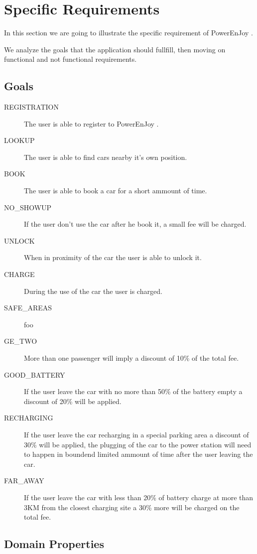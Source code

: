 \documentclass[11pt]{article} %
\newcommand{\pe}{PowerEnJoy }
\begin{document}
 




\newpage
\section{Specific Requirements}

In this section we are going to illustrate the specific requirement of \pe.

We analyze the goals that the application should fullfill, then moving on functional and not functional requirements.

 \subsection{Goals}
 
 \begin{description}
 	\item[REGISTRATION] The user is able to register to \pe.
 	\item[LOOKUP] The user is able to find cars nearby it's own position.
 	\item[BOOK] The user is able to book a car for a short ammount of time.
 	\item[NO\_SHOWUP] If the user don't use the car after he book it, a small fee will be charged.
 	\item[UNLOCK] When in proximity of the car the user is able to unlock it.
 	\item[CHARGE] During the use of the car the user is charged.
 	\item[SAFE\_AREAS] foo
 	\item[GE\_TWO] More than one passenger will imply a discount of 10\% of the total fee.
 	\item[GOOD\_BATTERY] If the user leave the car with no more than 50\% of the battery empty a discount of 20\% will be applied.
 	\item[RECHARGING] If the user leave the car recharging in a special parking area a discount of 30\% will be applied, the plugging of the car to the power station will need to happen in boundend limited ammount of time after the user leaving the car.
 	\item[FAR\_AWAY] If the user leave the car with less than 20\% of battery charge at more than 3KM from the closest charging site a 30\% more will be charged on the total fee.
 \end{description}

\subsection{Domain Properties}
\end{document}
